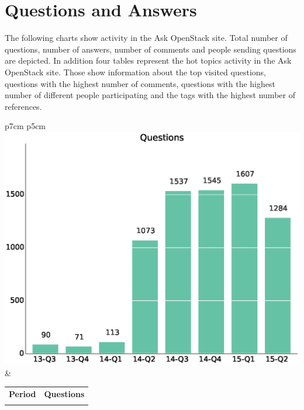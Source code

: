 \documentclass[a4wide,11pt]{report}
\begin{document}

\section{Questions and Answers}

The following charts show activity in the Ask OpenStack site. Total number of questions,
number of answers, number of comments and people sending questions are depicted. In addition
four tables represent the hot topics activity in the Ask OpenStack site. Those show information
about the top visited questions, questions with the highest number of comments, questions with
the highest number of different people participating and the tags with the highest number
of references. 

\begin{tabular}{p{7cm} p{5cm}}
    \vspace{0pt} 
    \includegraphics[scale=.35]{figs/questions.eps}
    & 
    \vspace{0pt}
    \begin{tabular}{l|l}%
    \bfseries Period & \bfseries Questions %
    \csvreader[head to column names]{data/questions.csv}{}%
    {\\ & \questions}
    \end{tabular}
\end{tabular}
\end{document}
